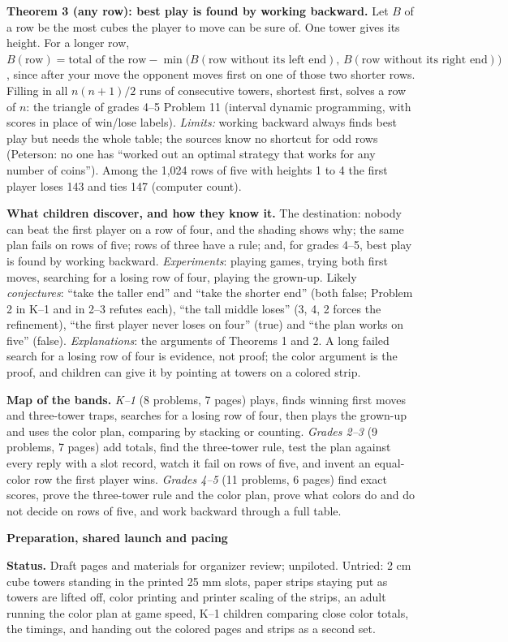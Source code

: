 \documentclass[11pt]{article}
\newcommand{\head}[1]{\par\Needspace{6\baselineskip}\medskip\textbf{\large #1}\par}
\begin{document}
\textbf{Theorem 3 (any row): best play is found by working backward.} Let $B$ of a row be the most cubes the player to move can be sure of. One tower gives its height. For a longer row, $B(\text{row}) = \text{total of the row} - \min\bigl(B(\text{row without its left end}),\,B(\text{row without its right end})\bigr)$, since after your move the opponent moves first on one of those two shorter rows. Filling in all $n(n+1)/2$ runs of consecutive towers, shortest first, solves a row of $n$: the triangle of grades 4--5 Problem 11 (interval dynamic programming, with scores in place of win/lose labels). \emph{Limits:} working backward always finds best play but needs the whole table; the sources know no shortcut for odd rows (Peterson: no one has ``worked out an optimal strategy that works for any number of coins''). Among the 1,024 rows of five with heights 1 to 4 the first player loses 143 and ties 147 (computer count).

\textbf{What children discover, and how they know it.} The destination: nobody can beat the first player on a row of four, and the shading shows why; the same plan fails on rows of five; rows of three have a rule; and, for grades 4--5, best play is found by working backward. \emph{Experiments}: playing games, trying both first moves, searching for a losing row of four, playing the grown-up. Likely \emph{conjectures}: ``take the taller end'' and ``take the shorter end'' (both false; Problem 2 in K--1 and in 2--3 refutes each), ``the tall middle loses'' (3, 4, 2 forces the refinement), ``the first player never loses on four'' (true) and ``the plan works on five'' (false). \emph{Explanations}: the arguments of Theorems 1 and 2. A long failed search for a losing row of four is evidence, not proof; the color argument is the proof, and children can give it by pointing at towers on a colored strip.

\textbf{Map of the bands.} \emph{K--1} (8 problems, 7 pages) plays, finds winning first moves and three-tower traps, searches for a losing row of four, then plays the grown-up and uses the color plan, comparing by stacking or counting. \emph{Grades 2--3} (9 problems, 7 pages) add totals, find the three-tower rule, test the plan against every reply with a slot record, watch it fail on rows of five, and invent an equal-color row the first player wins. \emph{Grades 4--5} (11 problems, 6 pages) find exact scores, prove the three-tower rule and the color plan, prove what colors do and do not decide on rows of five, and work backward through a full table.
\newpage
\head{Preparation, shared launch and pacing}
\textbf{Status.} Draft pages and materials for organizer review; unpiloted. Untried: 2 cm cube towers standing in the printed 25 mm slots, paper strips staying put as towers are lifted off, color printing and printer scaling of the strips, an adult running the color plan at game speed, K--1 children comparing close color totals, the timings, and handing out the colored pages and strips as a second set.
\end{document}
